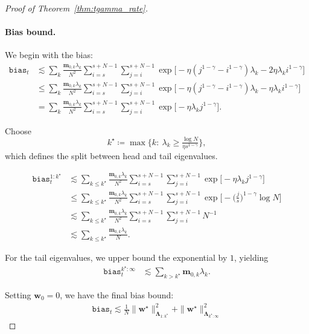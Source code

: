 \documentclass{article}
\def\w{{\mathbf{w}}}
\def\m{{\mathbf{m}}}
\def\bias{\mathtt{bias}}
\def\LLambda{{\mathbf{\Lambda}}}
\def\w{{\mathbf{w}}}
\def\m{{\mathbf{m}}}
\def\bias{\mathtt{bias}}
\def\LLambda{{\mathbf{\Lambda}}}
\theoremstyle{plain}
\def\w{{\mathbf{w}}}
\def\m{{\mathbf{m}}}
\def\bias{\mathtt{bias}}
\def\LLambda{{\mathbf{\Lambda}}}
\begin{document}
\begin{proof}[Proof of Theorem~\ref{thm:tgamma_rate}]
\paragraph{Bias bound.} We begin with the bias:
\begin{align*}
    \bias_t
    &\lesssim
    \sum_{k} \frac{\m_{0,k}\lambda_k}{N^2}
    \sum_{i=s}^{s+N-1} \sum_{j=i}^{s+N-1}
    \exp\Big[-\eta(j^{1-\gamma}-i^{1-\gamma})\lambda_k
               -2\eta \lambda_ki^{1-\gamma}\Big] \\
    &\le
    \sum_{k} \frac{\m_{0,k}\lambda_k}{N^2}
    \sum_{i=s}^{s+N-1} \sum_{j=i}^{s+N-1}
    \exp\Big[-\eta(j^{1-\gamma}-i^{1-\gamma})\lambda_k
               -\eta \lambda_k i^{1-\gamma}\Big] \\
    &=
    \sum_{k} \frac{\m_{0,k}\lambda_k}{N^2}
    \sum_{i=s}^{s+N-1} \sum_{j=i}^{s+N-1}
    \exp\big[-\eta \lambda_k j^{1-\gamma}\big].
\end{align*}

Choose
\[
k^\star
\coloneqq
\max\Big\{k:\ \lambda_k \ge \tfrac{\log N}{\eta s^{1-\gamma}}\Big\},
\]
which defines the split between head and tail eigenvalues.

\begin{align*}
    \bias_t^{1:k^\star}
    &\lesssim
    \sum_{k \le k^\star} \frac{\m_{0,k}\lambda_k}{N^2}
    \sum_{i=s}^{s+N-1} \sum_{j=i}^{s+N-1}
    \exp\big[-\eta \lambda_k j^{1-\gamma}\big] \\
    &\le
    \sum_{k \le k^\star} \frac{\m_{0,k}\lambda_k}{N^2}
    \sum_{i=s}^{s+N-1} \sum_{j=i}^{s+N-1}
    \exp\Big[-\Big(\tfrac{j}{s}\Big)^{1-\gamma}\log N\Big] \\
    &\lesssim
    \sum_{k \le k^\star} \frac{\m_{0,k}\lambda_k}{N^2}
    \sum_{i=s}^{s+N-1} \sum_{j=i}^{s+N-1} N^{-1} \\
    &\lesssim
    \sum_{k \le k^\star} \frac{\m_{0,k}\lambda_k}{N}.
\end{align*}

For the tail eigenvalues, we upper bound the exponential by \(1\), yielding
\begin{align*}
    \bias_t^{k^\star:\infty}
    &\lesssim
    \sum_{k > k^\star} \m_{0,k}\lambda_k .
\end{align*}

Setting $\w_0 = 0$, we have the final bias bound:
\begin{align}
    \bias_t \lesssim \frac{1}{N} \|\w^\star\|_{\LLambda_{1:k^\star}}^2 + \|\w^\star\|_{\LLambda_{k^\star:\infty}}^2
\end{align}


\end{proof}
\end{document}
